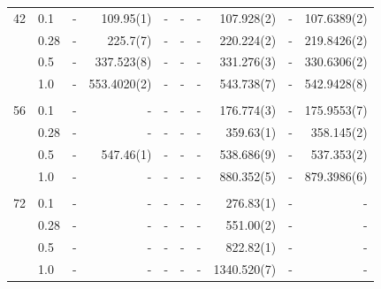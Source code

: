 \begin{landscape}
\begin{table} [H]
\begin{tabularx}{\hsize}{l:l|RRRRRRRR}
		42 & 0.1 & - & 109.95(1) & - & - & - & 107.928(2) & - & 107.6389(2) \\ 
		& 0.28 & - & 225.7(7) & - & - & - & 220.224(2) & - & 219.8426(2) \\
		& 0.5 & - & 337.523(8) & - & - & - & 331.276(3) & - & 330.6306(2) \\
		& 1.0 & - & 553.4020(2) & - & - & - & 543.738(7) & - & 542.9428(8) \\ \hdashline \\
		
		56 & 0.1 & - & - & - & - & - & 176.774(3) & - & 175.9553(7) \\ 
		& 0.28 & - & - & - & - & - & 359.63(1) & - & 358.145(2) \\
		& 0.5 & - & 547.46(1) & - & - & - & 538.686(9) & - & 537.353(2) \\
		& 1.0 & - & - & - & - & - & 880.352(5) & - & 879.3986(6) \\ \hdashline \\
		
		72 & 0.1 & - & - & - & - & - & 276.83(1) & - & - \\ 
		& 0.28 & - & - & - & - & - & 551.00(2) & - & - \\
		& 0.5 & - & - & - & - & - & 822.82(1) & - & - \\
		& 1.0 & - & - & - & - & - & 1340.520(7) & - & - \\ \hline\hline
	\end{tabularx}
\end{table}


\end{landscape}
